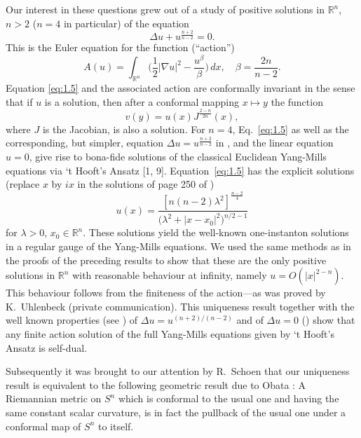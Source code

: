 Our interest in these questions grew out of a study of positive solutions in $\mathbb{R}^n$,
$n > 2$ ($n = 4$ in particular) of the equation
\begin{equation}\label{eq:1.5}
  \Delta u + u^{\frac{n+2}{n-2}} = 0.
\end{equation}
This is the Euler equation for the function (``action'')
\[A(u) = \int_{\mathbb{R}^n} \biggl(\frac{1}{2}|\nabla u|^2 - \frac{u^\beta}{\beta}\biggr)\,dx,
  \quad \beta = \frac{2n}{n-2}.\]
Equation \eqref{eq:1.5} and the associated action are conformally invariant 
in the sense that if $u$ is a solution, then after a conformal mapping $x\mapsto y$ the function
\begin{equation}
  v(y) = u(x) J^{\frac{2-n}{2n}}(x),
\end{equation}
where $J$ is the Jacobian, is also a solution. For $n=4$, Eq.~\eqref{eq:1.5}
as well as the corresponding, but simpler, equation $\Delta u = u^{\frac{n+2}{n-2}}$
in \cite{loewner_partial_1974},
and the linear equation $u = 0$, give rise to bona-fide solutions of the classical Euclidean
Yang-Mills equations via `t Hooft's Ansatz [1, 9]. 
Equation~\eqref{eq:1.5} has the explicit solutions (replace $x$ by $ix$ in the solutions of 
page 250 of \cite{loewner_partial_1974})
\begin{equation}\label{eq:1.7}
  u(x) = \frac{[n(n-2)\lambda^2]^{\frac{n-2}{4}}}{\bigl(\lambda^2+|x-x_0|^2\bigr)^{n/2-1}}
\end{equation}
for $\lambda>0$, $x_0\in \mathbb{R}^n$.
These solutions yield the well-known one-instanton solutions in a regular gauge of the Yang-Mills 
equations. We used the same methods as in the proofs of the preceding results to show that these
are the only positive solutions in $\mathbb{R}^n$ with reasonable behaviour at infinity,
namely $u=O(|x|^{2-n})$. This behaviour follows from the finiteness of the action---as was 
proved by K.~Uhlenbeck (private communication). This uniqueness result together with the well 
known properties (see \cite{loewner_partial_1974}) of $\Delta u = u^{(n+2)/(n-2)}$ and 
of $\Delta u = 0$ (\cite{hopf_differential_2003}) show 
that any finite action solution of the full Yang-Mills equations given by `t Hooft's Ansatz is 
self-dual.

Subsequently it was brought to our attention by R.~Schoen that our uniqueness result 
is equivalent to the following geometric result due to Obata \cite{obata_conjectures_1971}: A Riemannian metric on 
$S^n$ which is conformal to the usual one and having the same constant scalar curvature,
is in fact the pullback of the usual one under a conformal map of $S^n$ to itself.

